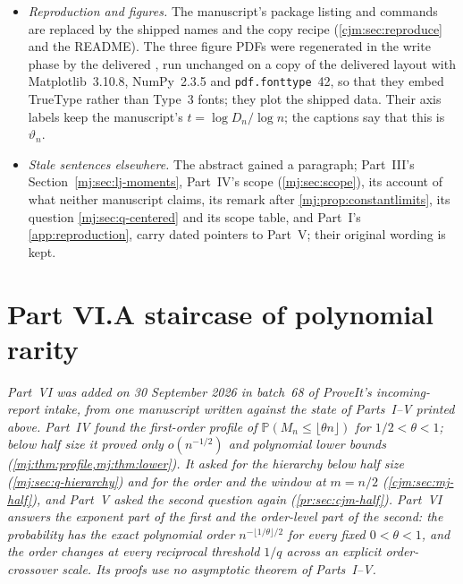 \documentclass[11pt,a4paper]{article}
\theoremstyle{definition}\newaliascnt{definition}{theorem}
\theoremstyle{remark}\newaliascnt{remark}{theorem}
\newcommand{\ljP}{\mathbb P}
\begin{document}
\begin{itemize}
\item \emph{Reproduction and figures.} The manuscript's package listing and
 commands are replaced by the shipped names and the copy recipe
 (\cref{cjm:sec:reproduce} and the README). The three figure PDFs were
 regenerated in the write phase by the delivered , run
 unchanged on a copy of the delivered layout with Matplotlib~3.10.8,
 NumPy~2.3.5 and \texttt{pdf.fonttype}~42, so that they embed TrueType
 rather than Type~3 fonts; they plot the shipped data. Their axis labels keep
 the manuscript's $t=\log D_n/\log n$; the captions say that this is
 $\vartheta_n$.
\item \emph{Stale sentences elsewhere.} The abstract gained a paragraph;
 Part~III's Section~\ref{mj:sec:lj-moments}, Part~IV's scope
 (\cref{mj:sec:scope}), its account of what neither manuscript claims, its
 remark after \cref{mj:prop:constantlimits}, its question
 \cref{mj:sec:q-centered} and its scope table, and Part~I's
 \cref{app:reproduction}, carry dated pointers to Part~V; their original
 wording is kept.
\end{itemize}


\clearpage
{}\part*{Part VI.\quad A staircase of polynomial rarity}

\noindent\emph{Part~VI was added on 30 September 2026 in batch~68 of
ProveIt's incoming-report intake, from one manuscript written against the
state of Parts~I--V printed above. Part~IV found the first-order profile of
$\ljP(M_n\le\lfloor\theta n\rfloor)$ for $1/2<\theta<1$; below half size it
proved only $o(n^{-1/2})$ and polynomial lower bounds
(\cref{mj:thm:profile,mj:thm:lower}). It asked for the hierarchy below half
size (\cref{mj:sec:q-hierarchy}) and for the order and the window at
$m=n/2$ (\cref{cjm:sec:mj-half}), and Part~V asked the second question again
(\cref{pr:sec:cjm-half}). Part~VI answers the exponent part of the first and
the order-level part of the second: the probability has the exact polynomial
order $n^{-\lfloor1/\theta\rfloor/2}$ for every fixed $0<\theta<1$, and the
order changes at every reciprocal threshold $1/q$ across an explicit
order-crossover scale. Its proofs use no asymptotic theorem of Parts~I--V.}
\end{document}
